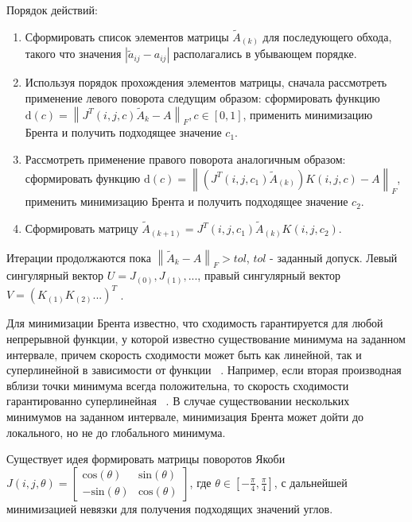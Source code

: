 Порядок действий:
\begin{enumerate}
    \item Сформировать список элементов матрицы $\tilde{A}_{(k)}$ для последующего обхода, такого что значения $|\tilde{a}_{ij} - a_{ij}|$ располагались в убывающем порядке.
    \item Используя порядок прохождения элементов матрицы, сначала рассмотреть применение левого поворота следущим образом: сформировать функцию \newline$\mathrm{d}(c)= \left\|J^T(i,j,c)\tilde{A}_{k} - A\right\|_F, c \in [0, 1]$, применить минимизацию Брента и получить подходящее значение $c_1$.
    \item Рассмотреть применение правого поворота аналогичным образом: сформировать функцию $\mathrm{d}(c) = \left\| (J^T(i,j,c_1)\tilde{A}_{(k)})K(i,j, c) - A \right\|_F$, применить минимизацию Брента и получить подходящее значение $c_2$.
    \item Сформировать матрицу $\tilde{A}_{(k+1)} =J^T(i,j,c_1)\tilde{A}_{(k)}K(i,j,c_2).$ 
    
\end{enumerate}

Итерации продолжаются пока $\left\| \tilde{A}_{k} - A\right\|_F >tol$, $tol$ - заданный допуск. Левый сингулярный вектор $U = J_{(0)}, J_{(1)}, ...$, правый сингулярный вектор $V = (K_{(1)}K_{(2)}...)^T$ .

Для минимизации Брента известно, что сходимость  гарантируется для любой непрерывной функции, у которой известно существование минимума на заданном интервале, причем скорость сходимости может быть как линейной, так и суперлинейной в зависимости от функции ~\cite{Brent_2013}. Например, если вторая производная вблизи точки минимума всегда положительна, то скорость сходимости гарантированно суперлинейная ~\cite{Brent1971}. В случае существовании нескольких минимумов на заданном интервале, минимизация Брента может дойти до локального, но не до глобального минимума. 

\begin{note}
    Существует идея формировать матрицы поворотов Якоби $J(i,j,\theta) = \begin{bmatrix}
        \mathrm{cos}(\theta)&\mathrm{sin}(\theta)\\
        \mathrm{-sin}(\theta)&\mathrm{cos}(\theta)
    \end{bmatrix}$, где $\theta \in [-\frac{\pi}{4}, \frac{\pi}{4}]$, с дальнейшей минимизацией невязки для получения подходящих значений углов. 
\end{note}

